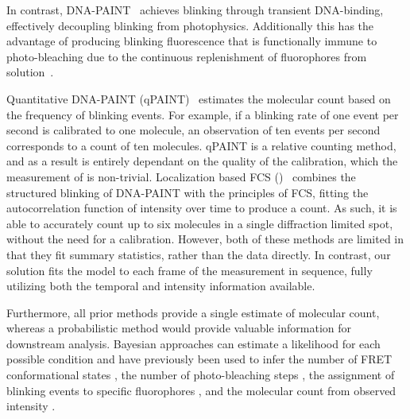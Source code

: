 %
In contrast, DNA-PAINT~\citep{schnitzbauer_2017} achieves blinking through transient 
DNA-binding, effectively decoupling blinking from photophysics. Additionally this has 
the advantage of producing blinking fluorescence that is functionally immune to 
photo-bleaching due to the continuous replenishment of fluorophores from 
solution~\citep{stehr_2021}.

  Quantitative DNA-PAINT (qPAINT)~\citep{jungmann_2016} estimates the molecular
  count based on the frequency of blinking events. For example, if a blinking rate of one
  event per second is calibrated to one molecule, an observation of
  ten events per second corresponds to a count of ten molecules. 
  qPAINT is a relative counting method, and as a result is entirely dependant on the quality of 
  the calibration, which the measurement of is non-trivial.
  Localization based FCS (\lbfcs)~\citep{stein_2019,stein_2021} combines the
  structured blinking of DNA-PAINT with the principles of FCS, fitting the
  autocorrelation function of intensity over time to produce a count. As such,
  it is able to accurately count up to six molecules in a single diffraction
  limited spot, without the need for a calibration.
  However, both of these methods are limited in that they fit summary
  statistics, rather than the data directly.
  In contrast, our solution fits the model to each frame of the measurement 
  in sequence, fully utilizing both the temporal and intensity information available.
  
Furthermore, all prior methods provide a single estimate of molecular count, whereas 
a probabilistic method would provide valuable information for downstream analysis.
  Bayesian approaches can estimate a likelihood for each possible condition 
  and have previously been used to infer the number of FRET conformational 
  states \citep{hon_bayesian-estimated_2019, bronson_learning_2009}, 
  the number of photo-bleaching steps \citep{garry_bayesian_2020},
  the assignment of blinking events to specific fluorophores \citep{gabitto_bayesian_2021, fazel_bayesian_2019},
  and the molecular count from observed intensity \citep{nino_2017}.

